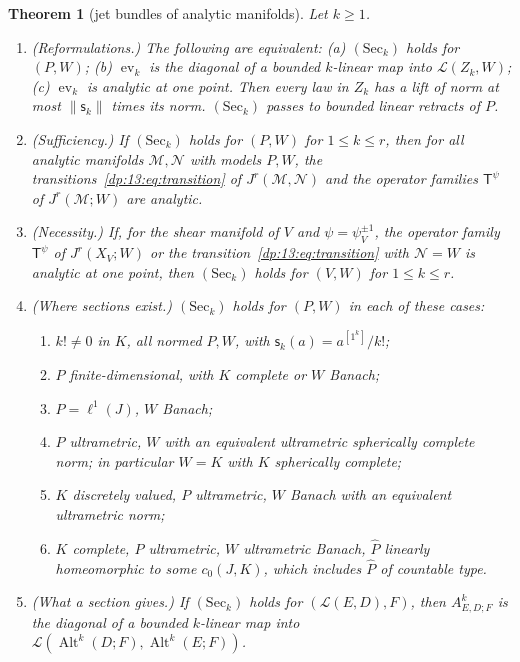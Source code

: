 \documentclass[11pt]{amsart}
\newtheorem{theorem}{Theorem}[section]
\theoremstyle{definition}
\theoremstyle{remark}
\numberwithin{equation}{section}
\newcommand{\cL}{\mathcal L}
\newcommand{\Alt}{\operatorname{Alt}}
\newcommand{\norm}[1]{\lVert #1\rVert}
\theoremstyle{plain}
\theoremstyle{definition}
\theoremstyle{plain}
\newcommand{\ev}{\operatorname{ev}}
\begin{document}
\begin{theorem}[jet bundles of analytic manifolds]\label{dp:thm:analytic-jets}
Let $k\ge1$.
\begin{enumerate}
\item \textup{(Reformulations.)} The following are equivalent: \textup{(a)} $(\mathrm{Sec}_k)$ holds for $(P,W)$; \textup{(b)} $\ev_k$ is the diagonal of a bounded $k$-linear map into $\cL(Z_k,W)$; \textup{(c)} $\ev_k$ is analytic at one point. Then every law in $Z_k$ has a lift of norm at most $\norm{\mathsf s_k}$ times its norm. $(\mathrm{Sec}_k)$ passes to bounded linear retracts of $P$.
\item \textup{(Sufficiency.)} If $(\mathrm{Sec}_k)$ holds for $(P,W)$ for $1\le k\le r$, then for all analytic manifolds $\mathcal M,\mathcal N$ with models $P,W$, the transitions~\eqref{dp:13:eq:transition} of $J^r(\mathcal M,\mathcal N)$ and the operator families $\mathsf T^\psi$ of $J^r(\mathcal M;W)$ are analytic.
\item \textup{(Necessity.)} If, for the shear manifold of $V$ and $\psi=\psi_V^{\pm1}$, the operator family $\mathsf T^\psi$ of $J^r(X_V;W)$ or the transition~\eqref{dp:13:eq:transition} with $\mathcal N=W$ is analytic at one point, then $(\mathrm{Sec}_k)$ holds for $(V,W)$ for $1\le k\le r$.
\item \textup{(Where sections exist.)} $(\mathrm{Sec}_k)$ holds for $(P,W)$ in each of these cases:
\begin{enumerate}
\item $k!\ne0$ in $K$, all normed $P,W$, with $\mathsf s_k(a)=a^{[1^k]}/k!$;
\item $P$ finite-dimensional, with $K$ complete or $W$ Banach;
\item $P=\ell^1(J)$, $W$ Banach;
\item $P$ ultrametric, $W$ with an equivalent ultrametric spherically complete norm; in particular $W=K$ with $K$ spherically complete;
\item $K$ discretely valued, $P$ ultrametric, $W$ Banach with an equivalent ultrametric norm;
\item $K$ complete, $P$ ultrametric, $W$ ultrametric Banach, $\widehat P$ linearly homeomorphic to some $c_0(J,K)$, which includes $\widehat P$ of countable type.
\end{enumerate}
\item \textup{(What a section gives.)} If $(\mathrm{Sec}_k)$ holds for $(\cL(E,D),F)$, then $A^k_{E,D;F}$ is the diagonal of a bounded $k$-linear map into $\cL(\Alt^k(D;F),\Alt^k(E;F))$.

\end{enumerate}
\end{theorem}
\end{document}
